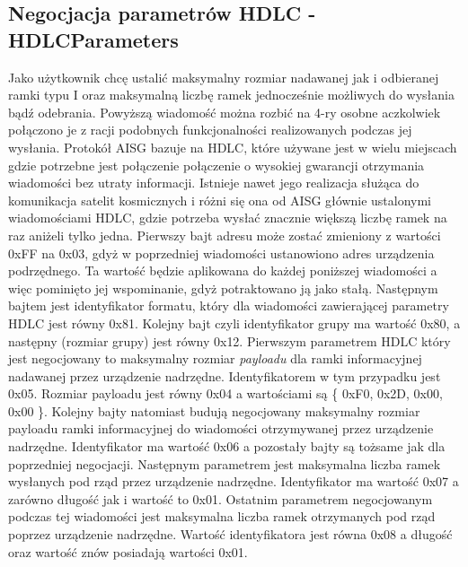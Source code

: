 		\subsection{Negocjacja parametrów HDLC - HDLCParameters}
			Jako użytkownik chcę ustalić maksymalny rozmiar nadawanej jak i odbieranej ramki typu I oraz maksymalną liczbę ramek jednocześnie możliwych do wysłania bądź odebrania.
			\newline\newline
			Powyższą wiadomość można rozbić na 4-ry osobne aczkolwiek połączono je z racji podobnych funkcjonalności realizowanych podczas jej wysłania. Protokół AISG bazuje na HDLC, które używane jest w wielu miejscach
			gdzie potrzebne jest połączenie połączenie o wysokiej gwarancji otrzymania wiadomości bez utraty informacji. Istnieje nawet jego realizacja służąca do komunikacja satelit kosmicznych i różni się ona od AISG głównie
			ustalonymi wiadomościami HDLC, gdzie potrzeba wysłać znacznie większą liczbę ramek na raz aniżeli tylko jedna.
			Pierwszy bajt adresu może zostać zmieniony z wartości 0xFF na 0x03, gdyż w poprzedniej wiadomości ustanowiono adres urządzenia podrzędnego. Ta wartość będzie aplikowana do każdej poniższej wiadomości a więc pominięto jej wspominanie,
			gdyż potraktowano ją jako stałą.
			\newline
			Następnym bajtem jest identyfikator formatu, który dla wiadomości zawierającej parametry HDLC jest równy 0x81.
			\newline
			Kolejny bajt czyli identyfikator grupy ma wartość 0x80, a następny (rozmiar grupy) jest równy 0x12.
			\newline
			Pierwszym parametrem HDLC który jest negocjowany to maksymalny rozmiar \textit{payloadu} dla ramki informacyjnej nadawanej przez urządzenie nadrzędne. Identyfikatorem w tym przypadku jest 0x05. Rozmiar payloadu jest równy 0x04 a wartościami są \{ 0xF0, 0x2D, 0x00, 0x00 \}.
			\newline
			Kolejny bajty natomiast budują negocjowany maksymalny rozmiar payloadu ramki informacyjnej do wiadomości otrzymywanej przez urządzenie nadrzędne. Identyfikator ma wartość 0x06 a pozostały bajty są tożsame jak dla poprzedniej
			negocjacji.
			\newline
			Następnym parametrem jest maksymalna liczba ramek wysłanych pod rząd przez urządzenie nadrzędne. Identyfikator ma wartość 0x07 a zarówno długość jak i wartość to 0x01.
			\newline
			Ostatnim parametrem negocjowanym podczas tej wiadomości jest maksymalna liczba ramek otrzymanych pod rząd poprzez urządzenie nadrzędne. Wartość identyfikatora jest równa 0x08 a długość oraz wartość znów posiadają wartości 0x01.
